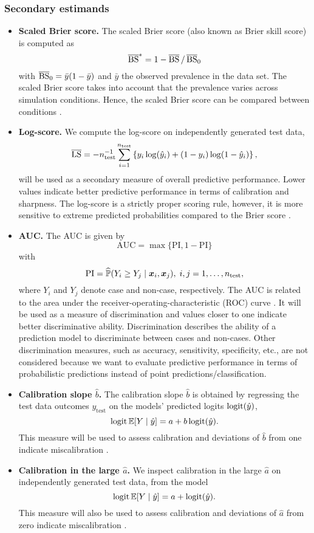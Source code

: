 \subsubsection{Secondary estimands}
\begin{itemize}
  \item \textbf{Scaled Brier score.} The scaled Brier score (also known as Brier skill score) is computed as
  $$\operatorname{\overline{BS}}^{*} = 1 - \operatorname{\overline{BS}}/\operatorname{\overline{BS}}_{0}$$
  with $\operatorname{\overline{BS}}_{0} = \bar{y}(1 - \bar{y})$ and $\bar{y}$ the observed prevalence in
  the data set. The scaled Brier score takes into account that the
  prevalence varies across simulation conditions. Hence, the scaled Brier score
  can be compared between conditions \citep{Schmid2005, steyerberg2019clinical}.

  \item \textbf{Log-score.} We compute the log-score on independently generated test data,
  $$\operatorname{\overline{LS}} = - n_{\text{test}}^{-1} \sum_{i=1}^{n_{\text{test}}} \left\{ y_{i} \log(\hat{y}_{i})
  + (1 - y_{i}) \log (1 - \hat{y}_{i})\right\},$$
  will be used as a secondary measure of overall predictive performance. Lower
  values indicate better predictive performance in terms of calibration and
  sharpness. The log-score is a strictly proper scoring rule, however, it is more
  sensitive to extreme predicted probabilities compared to the Brier score \citep{Gneiting2007}.

  \item \textbf{AUC.} The AUC is given by
  $$\text{AUC} = \max\{\text{PI}, 1 - \text{PI}\}$$
  with $$\text{PI} =
  \widehat{\mathbb{P}}(Y_i \geq Y_j \mid \text{\boldmath$x$}_i, \text{\boldmath$x$}_j), \; i,j = 1, \dots, n_{\text{test}},$$
  where $Y_i$ and $Y_j$ denote case and non-case, respectively. The AUC is related
  to the area under the receiver-operating-characteristic (ROC) curve \citep{steyerberg2019clinical}.
  It will be used as a measure of discrimination and values closer to one
  indicate better discriminative ability. Discrimination describes the ability
  of a prediction model to discriminate between cases and non-cases.
  Other discrimination measures, such as accuracy, sensitivity, specificity, etc.,
  are not considered because we want to evaluate predictive performance
  in terms of probabilistic predictions instead of point predictions/classification.

  \item \textbf{Calibration slope $\hat b$.}
  The calibration slope $\hat b$ is obtained by regressing
  the test data outcomes $y_{\text{test}}$ on the models' predicted logits $\operatorname{logit}({\hat{y}})$,
  \ie
  $$\operatorname{logit}\mathbb{E}[Y \mid \hat{y}] = a + b\operatorname{logit}(\hat{y}).$$
  This measure will be used to assess calibration and deviations of $\hat b$ from
  one indicate miscalibration \citep{steyerberg2019clinical}.

  \item \textbf{Calibration in the large $\hat a$.} We inspect calibration in the
  large $\hat a$ on independently generated test data, from the model
  $$\operatorname{logit}\mathbb{E}[Y \mid \hat{y}] = a + \operatorname{logit}(\hat{y}).$$
  This measure will also be used to assess calibration and deviations of $\hat a$ from
  zero indicate miscalibration \citep{steyerberg2019clinical}.
\end{itemize}

